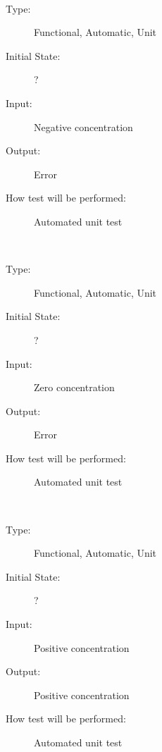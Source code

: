 \documentclass[12pt, titlepage]{article}
\newcounter{testnum} %
\begin{document}
\begin{addmargin}[2em]{0em}
\\
\begin{addmargin}[2em]{0em}
\begin{description}
\item[Type:] Functional, Automatic, Unit
					
\item[Initial State:] ?
					
\item[Input:] Negative concentration
					
\item[Output:] Error
					
\item[How test will be performed:] Automated unit test\\
\end{description}
\end{addmargin}

\\
\begin{addmargin}[2em]{0em}
\begin{description}
\item[Type:] Functional, Automatic, Unit
					
\item[Initial State:] ?
					
\item[Input:] Zero concentration
					
\item[Output:] Error
					
\item[How test will be performed:] Automated unit test\\
\end{description}
\end{addmargin}

\\
\begin{addmargin}[2em]{0em}
\begin{description}
\item[Type:] Functional, Automatic, Unit
					
\item[Initial State:] ?
					
\item[Input:] Positive concentration
					
\item[Output:] Positive concentration
					
\item[How test will be performed:] Automated unit test\\
\end{description}
\end{addmargin}
\end{addmargin}
\end{document}
